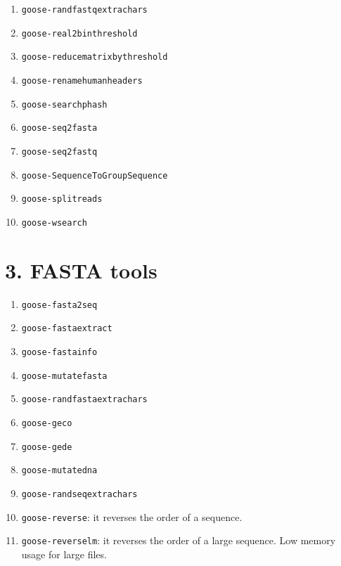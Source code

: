 \documentclass[11pt,journal,compsoc]{report}[1]
\begin{document}
\begin{enumerate}
\item \texttt{goose-randfastqextrachars}

\item \texttt{goose-real2binthreshold}
\item \texttt{goose-reducematrixbythreshold}
\item \texttt{goose-renamehumanheaders}


\item \texttt{goose-searchphash}

\item \texttt{goose-seq2fasta}
\item \texttt{goose-seq2fastq}
\item \texttt{goose-SequenceToGroupSequence}
\item \texttt{goose-splitreads}

\item \texttt{goose-wsearch}
\end{enumerate}

\chapter*{3. FASTA tools}
\label{fasta}

\begin{enumerate}
\item \texttt{goose-fasta2seq}
\item \texttt{goose-fastaextract}
\item \texttt{goose-fastainfo}
\item \texttt{goose-mutatefasta}
\item \texttt{goose-randfastaextrachars}
\item \texttt{goose-geco}
\item \texttt{goose-gede}
\item \texttt{goose-mutatedna}
\item \texttt{goose-randseqextrachars}
\item \texttt{goose-reverse}: it reverses the order of a sequence.
\item \texttt{goose-reverselm}: it reverses the order of a large sequence. Low memory usage for large files.
\end{enumerate}
\end{document}
